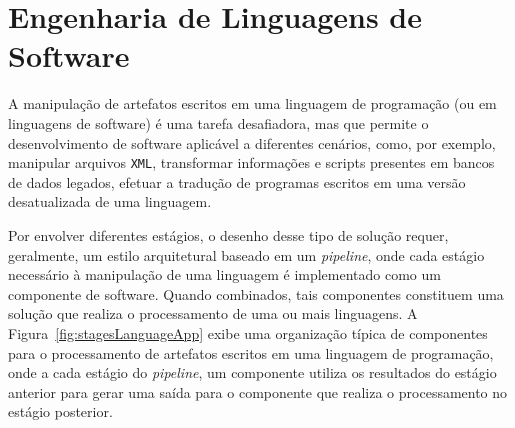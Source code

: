 

\section{Engenharia de Linguagens de Software}\label{sec:softEng}



A manipulação de artefatos escritos em 
uma linguagem de programação (ou em linguagens de software) 
é uma tarefa desafiadora, mas que permite o desenvolvimento 
de software aplicável a diferentes cenários, como, por exemplo, 
manipular arquivos \texttt{XML}, transformar 
informações e scripts presentes 
em bancos de dados legados, efetuar a tradução de programas 
escritos em uma versão desatualizada de uma linguagem. 

Por envolver diferentes estágios, o desenho desse tipo de solução requer, geralmente, 
um estilo arquitetural baseado em um \emph{pipeline},  onde cada estágio necessário à  
 manipulação de uma linguagem é implementado como um componente de software. Quando combinados, 
tais componentes constituem uma solução que realiza o processamento 
de uma ou mais linguagens. A Figura~\ref{fig:stagesLanguageApp} exibe uma organização 
típica de componentes para o processamento de artefatos escritos em uma linguagem de 
programação, onde a cada estágio do \emph{pipeline}, um componente 
utiliza os resultados do estágio anterior para gerar uma saída para o componente 
que realiza o processamento no estágio posterior.  

